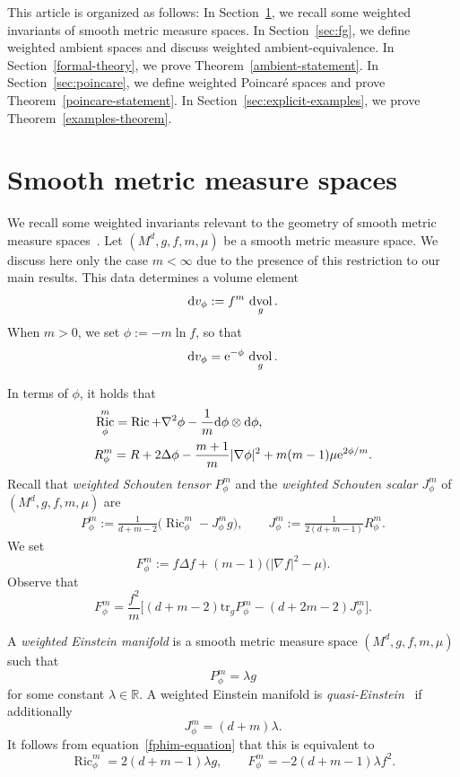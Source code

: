 \documentclass[10pt,a4paper]{amsart}
\DeclareMathOperator{\dvol}{dvol}
\DeclareMathOperator{\Ric}{Ric}
\newcommand{\lv}{\lvert}
\newcommand{\rv}{\rvert}
\newcommand{\bR}{\mathbb{R}}
\numberwithin{equation}{section}
\begin{document}
This article is organized as follows: In Section~\ref{sec:bg.tex}, we recall some weighted invariants of smooth metric measure spaces. In Section~\ref{sec:fg}, we define weighted ambient spaces and discuss weighted ambient-equivalence. In Section~\ref{formal-theory}, we prove Theorem~\ref{ambient-statement}. In Section~\ref{sec:poincare}, we define weighted Poincar\'e spaces and prove Theorem~\ref{poincare-statement}. In Section~\ref{sec:explicit-examples}, we prove Theorem~\ref{examples-theorem}.

\section{Smooth metric measure spaces}
\label{sec:bg.tex}

We recall some weighted invariants relevant to the geometry of smooth metric measure spaces~\cite{Case2014s}. Let $(M^d,g,f,m,\mu)$ be a smooth metric measure space. We discuss here only the case $m<\infty$ due to the presence of this restriction to our main results. This data determines a volume element
\[
{\rm d}v_\phi := f^m\,\dvol_g .
\]
When $m>0$, we set $\phi:=-m\ln f$, so that
\[
{\rm d}v_\phi = {\rm e}^{-\phi}\,\dvol_g .
\]


In terms of $\phi$, it holds that
\begin{align*}
&\Ric_\phi^m= \Ric + \nabla^2\phi - \frac{1}{m} {\rm d}\phi \otimes {\rm d}\phi,
\\
&R_\phi^m= R + 2\Delta\phi - \frac{m+1}{m}\lv\nabla\phi\rv^2 + m(m-1)\mu {\rm e}^{2\phi/m} .
\end{align*}
Recall that \emph{weighted Schouten tensor $P_\phi^m$} and the \emph{weighted Schouten scalar $J_\phi^m$} of $(M^d,g,f,m,\mu)$ are
\begin{gather*}
 P_\phi^m := \frac{1}{d+m-2}\big(\Ric_\phi^m - J_\phi^m g\big), \qquad
 J_\phi^m := \frac{1}{2(d+m-1)}R_\phi^m .
\end{gather*}
We set
\[
F_\phi^m:= f\Delta f+(m-1)\big(|\nabla f|^2-\mu\big).
\]
Observe that
\begin{equation}\label{fphim-equation}
F_\phi^m=\frac{f^2}{m}\bigl[(d+m-2)\mathrm{tr}_g P_\phi^m -(d+2m-2)J_\phi^m\bigr].
\end{equation}

A \emph{weighted Einstein manifold} is a smooth metric measure space $(M^d,g,f,m,\mu)$ such that
\[
P_\phi^m = \lambda g
\]
for some constant $\lambda\in\bR$.
A weighted Einstein manifold is \emph{quasi-Einstein}~\cite{Case_Shu_Wei} if additionally
\[
J_\phi^m=(d+m)\lambda.
\]
It follows from equation~\eqref{fphim-equation} that this is equivalent to
\[
\Ric_\phi^m=2(d+m-1)\lambda g,\qquad F_\phi^m=-2(d+m-1)\lambda f^2.
\]
\end{document}

